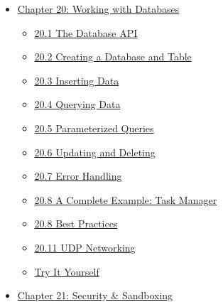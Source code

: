 \documentclass[
  english,
]{book}
\providecommand{\tightlist}{%
  \setlength{\itemsep}{0pt}\setlength{\parskip}{0pt}}
\begin{document}
\begin{itemize}
  \begin{itemize}
  \tightlist
  \item
    \hyperref[191-initializing-a-project]{19.1 Initializing a Project}
  \item
    \hyperref[192-the-iristoml-manifest]{19.2 The \texttt{iris.toml}
    Manifest}
  \item
    \hyperref[193-managing-dependencies]{19.3 Managing Dependencies}
  \item
    \hyperref[194-package-subcommands]{19.4 Package Subcommands}
  \item
    \hyperref[try-it-yourself]{Try It Yourself}
  \end{itemize}
\item
  \hyperref[chapter-20-working-with-databases]{Chapter 20: Working with
  Databases}

  \begin{itemize}
  \tightlist
  \item
    \hyperref[201-the-database-api]{20.1 The Database API}
  \item
    \hyperref[202-creating-a-database-and-table]{20.2 Creating a
    Database and Table}
  \item
    \hyperref[203-inserting-data]{20.3 Inserting Data}
  \item
    \hyperref[204-querying-data]{20.4 Querying Data}
  \item
    \hyperref[205-parameterized-queries]{20.5 Parameterized Queries}
  \item
    \hyperref[206-updating-and-deleting]{20.6 Updating and Deleting}
  \item
    \hyperref[207-error-handling]{20.7 Error Handling}
  \item
    \hyperref[208-a-complete-example-task-manager]{20.8 A Complete
    Example: Task Manager}
  \item
    \hyperref[208-best-practices]{20.8 Best Practices}
  \item
    \hyperref[2011-udp-networking]{20.11 UDP Networking}
  \item
    \hyperref[try-it-yourself]{Try It Yourself}
  \end{itemize}
\item
  \hyperref[chapter-21-security--sandboxing]{Chapter 21: Security \&
  Sandboxing}


\end{itemize}
\end{document}
